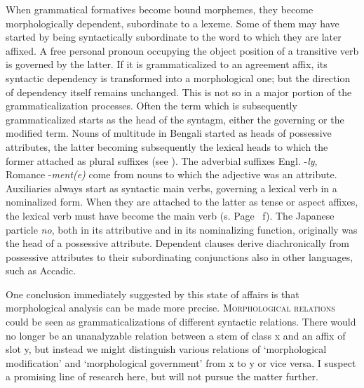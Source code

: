 When grammatical formatives become bound morphemes, they become morphologically dependent, subordinate to a lexeme. Some of them may have started by being syntactically subordinate to the word to which they are later affixed. A free personal pronoun occupying the object position of a transitive verb is governed by the latter. If it is grammaticalized to an agreement affix, its syntactic dependency is transformed into a morphological one; but the direction of dependency itself remains unchanged. This is not so in a major portion of the grammaticalization processes. Often the term which is subsequently grammaticalized starts as the head of the syntagm, either the governing or the modified term. Nouns of multitude in Bengali started as heads of possessive attributes, the latter becoming subsequently the lexical heads to which the former attached as plural suffixes (see \citealt[§~2.1]{Kölver1982a}). The adverbial suffixes Engl. -\textit{ly}, Romance -\textit{ment(e)} come from nouns to which the adjective was an attribute. Auxiliaries always start as syntactic main verbs, governing a lexical verb in a nominalized form. When they are attached to the latter as tense or aspect affixes, the lexical verb must have become the main verb (s. Page~\pageref{page36}\chk%
f). The Japanese particle \textit{no}, both in its attributive and in its nominalizing function, originally was the head of a possessive attribute. Dependent clauses derive diachronically from possessive attributes to their subordinating conjunctions also in other languages, such as Accadic.

One conclusion immediately suggested by this state of affairs is that morphological analysis can be made more precise. \textsc{Morphological relations} could be seen as grammaticalizations of different syntactic relations. There would no longer be an unanalyzable relation between a stem of class x and an affix of slot y, but instead we might distinguish various relations of ‘morphological modification’ and ‘morphological government’ from x to y or vice versa. I suspect a promising line of research here, but will not pursue the matter further.

